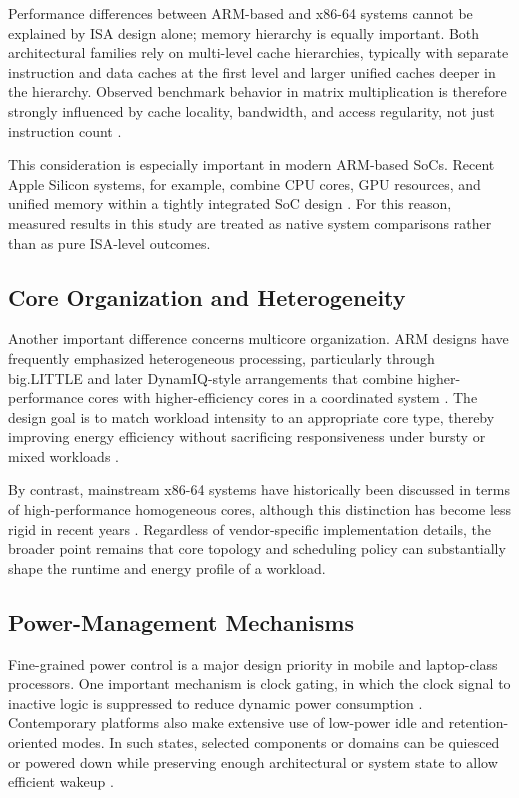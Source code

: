 \documentclass{tcsa}
\begin{document}
Performance differences between ARM-based and x86-64 systems cannot be explained by 
ISA design alone; memory hierarchy is equally important. Both architectural families 
rely on multi-level cache hierarchies, typically with separate instruction and data 
caches at the first level and larger unified caches deeper in the hierarchy. 
Observed benchmark behavior in matrix multiplication is 
therefore strongly influenced by cache locality, bandwidth, and access regularity, 
not just instruction count \cite{hennessy_patterson_2019,intel_optimization_manual_2024}.

This consideration is especially important in modern ARM-based SoCs. Recent 
Apple Silicon systems, for example, combine CPU cores, GPU resources, and unified 
memory within a tightly integrated SoC design \cite{apple_perf_eff,apple_vs_oranges,hubner2025}. For this reason, measured results in 
this study are treated as native system comparisons rather than as pure ISA-level 
outcomes.

\subsection{Core Organization and Heterogeneity}

Another important difference concerns multicore organization. ARM designs have 
frequently emphasized heterogeneous processing, particularly through big.LITTLE and 
later DynamIQ-style arrangements that combine higher-performance cores with 
higher-efficiency cores in a coordinated system \cite{arm_big_little,arm_dynamIQ}. The design goal is to match 
workload intensity to an appropriate core type, thereby improving energy efficiency 
without sacrificing responsiveness under bursty or mixed workloads \cite{apple_perf_eff}.

By contrast, mainstream x86-64 systems have historically been discussed in terms of 
high-performance homogeneous cores, although this distinction has become less rigid 
in recent years \cite{intel_hybrid}. Regardless of vendor-specific implementation details, the broader 
point remains that core topology and scheduling policy can substantially shape the 
runtime and energy profile of a workload.

\subsection{Power-Management Mechanisms}

Fine-grained power control is a major design priority in mobile and laptop-class
processors. One important mechanism is clock gating, in which the clock signal to
inactive logic is suppressed to reduce dynamic power consumption
\cite{hennessy_patterson_2019}. Contemporary platforms also make extensive use of
low-power idle and retention-oriented modes. In such states, selected components or
domains can be quiesced or powered down while preserving enough architectural or
system state to allow efficient wakeup \cite{intel_power_states,apple_perf_eff}.
\end{document}

